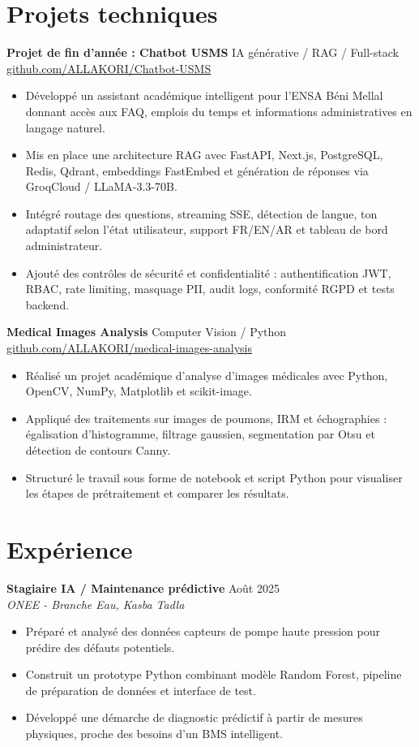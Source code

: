 \documentclass[10pt,a4paper]{article}
\newcommand{\role}[3]{%
  \textbf{#1} \hfill #3\\
  \textit{#2}\vspace{1pt}
}
\begin{document}
\section{Projets techniques}
\textbf{Projet de fin d'année : Chatbot USMS} \hfill IA générative / RAG / Full-stack\\
\href{https://github.com/ALLAKORI/Chatbot-USMS}{github.com/ALLAKORI/Chatbot-USMS}
\begin{itemize}
  \item Développé un assistant académique intelligent pour l'ENSA Béni Mellal donnant accès aux FAQ, emplois du temps et informations administratives en langage naturel.
  \item Mis en place une architecture RAG avec FastAPI, Next.js, PostgreSQL, Redis, Qdrant, embeddings FastEmbed et génération de réponses via GroqCloud / LLaMA-3.3-70B.
  \item Intégré routage des questions, streaming SSE, détection de langue, ton adaptatif selon l'état utilisateur, support FR/EN/AR et tableau de bord administrateur.
  \item Ajouté des contrôles de sécurité et confidentialité : authentification JWT, RBAC, rate limiting, masquage PII, audit logs, conformité RGPD et tests backend.
\end{itemize}

\textbf{Medical Images Analysis} \hfill Computer Vision / Python\\
\href{https://github.com/ALLAKORI/medical-images-analysis}{github.com/ALLAKORI/medical-images-analysis}
\begin{itemize}
  \item Réalisé un projet académique d'analyse d'images médicales avec Python, OpenCV, NumPy, Matplotlib et scikit-image.
  \item Appliqué des traitements sur images de poumons, IRM et échographies : égalisation d'histogramme, filtrage gaussien, segmentation par Otsu et détection de contours Canny.
  \item Structuré le travail sous forme de notebook et script Python pour visualiser les étapes de prétraitement et comparer les résultats.
\end{itemize}

\section{Expérience}
\role{Stagiaire IA / Maintenance prédictive}{ONEE - Branche Eau, Kasba Tadla}{Août 2025}
\begin{itemize}
  \item Préparé et analysé des données capteurs de pompe haute pression pour prédire des défauts potentiels.
  \item Construit un prototype Python combinant modèle Random Forest, pipeline de préparation de données et interface de test.
  \item Développé une démarche de diagnostic prédictif à partir de mesures physiques, proche des besoins d'un BMS intelligent.
\end{itemize}
\end{document}
